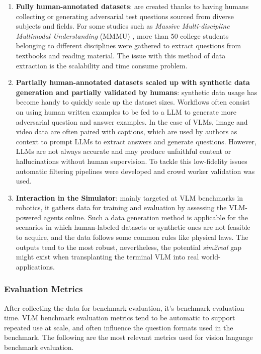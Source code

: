 \begin{enumerate}
	\item \textbf{Fully human-annotated datasets}: are created thanks to having humans collecting or generating adversarial test questions sourced from diverse subjects and fields. For some studies such as \textit{Massive Multi-discipline Multimodal Understanding} (MMMU) \cite{yue2024mmmumassivemultidisciplinemultimodal}, more than 50 college students belonging to different disciplines were gathered to extract questions from textbooks and reading material. The issue with this method of data extraction is the scalability and time consume problem. 
	
	\item \textbf{Partially human-annotated datasets scaled up with synthetic data generation and partially validated by humans}: synthetic data usage has become handy to quickly scale up the dataset sizes. Workflows often consist on using human written examples to be fed to a LLM to generate more adversarial question and answer examples. In the case of VLMs, image and video data are
	often paired with captions, which are used by authors as context to prompt LLMs to extract answers and generate questions. However, LLMs are not always accurate and may produce unfaithful content or hallucinations without human supervision. To tackle this low-fidelity issues automatic filtering pipelines were developed and crowd worker validation was used. 
	
	\item \textbf{Interaction in the Simulator}: mainly targeted at VLM benchmarks in robotics, it gathers data for training and evaluation by assessing the VLM-powered agents online. Such a data generation method is applicable for the scenarios in which human-labeled datasets or synthetic ones are not feasible to acquire, and the data follows some common rules like physical laws. The outputs tend to the most robust, nevertheless, the potential \textit{sim2real} gap might exist when transplanting the terminal VLM into real world-applications. 
\end{enumerate}

\subsubsection{Evaluation Metrics}
After collecting the data for benchmark evaluation, it's benchmark evaluation time. VLM benchmark evaluation metrics tend to be automatic to support repeated use at scale, and often influence the question formats used in the benchmark. The following are the most relevant metrics used for vision language benchmark evaluation. 

